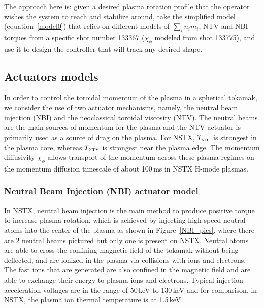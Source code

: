 \documentclass[12pt]{iopart}
\begin{document}
The approach here is: given a desired plasma rotation profile that the operator wishes the system to reach and stabilize around, take the simplified model (equation~\ref{model0}) that relies on different models of $\sum_i n_i m_i$, NTV and NBI torques from a specific shot number 133367 ($\chi_\phi$ modeled from shot 133775), and use it to design the controller that will track any desired shape.

\subsection{Actuators models}

In order to control the toroidal momentum of the plasma in a spherical tokamak, we consider the use of two actuator mechanisms, namely, the neutral beam injection (NBI) and the neoclassical toroidal viscosity (NTV). The neutral beams are the main sources of momentum for the plasma and the NTV actuator is primarily used as a source of drag on the plasma. For NSTX, $T_\textrm{\tiny NBI}$ is strongest in the plasma core, whereas $T_\textrm{\tiny NTV}$ is strongest near the plasma edge. The momentum diffusivity $\chi_\phi$ allows transport of the momentum across these plasma regimes on the momentum diffusion timescale of about 100\,ms in NSTX H-mode plasmas.


\subsubsection{Neutral Beam Injection (NBI) actuator model}
 \label{NBIAM}

In NSTX, neutral beam injection is the main method to produce positive torque to increase plasma rotation, which is achieved  by injecting high-speed neutral atoms into the center of the plasma as shown in Figure~{\ref{NBI_pics}}, where there are 2 neutral beams pictured but only one is present on NSTX. Neutral atoms are able to cross the confining magnetic field of the tokamak without being deflected, and are ionized in the plasma via collisions with ions and electrons. The fast ions that are generated are also confined in the magnetic field and are able to exchange their energy to plasma ions and electrons. Typical injection acceleration voltages are in the range of 50\,keV to 130\,keV and for comparison, in NSTX, the plasma ion thermal temperature is at 1.5\,keV.
\end{document}
